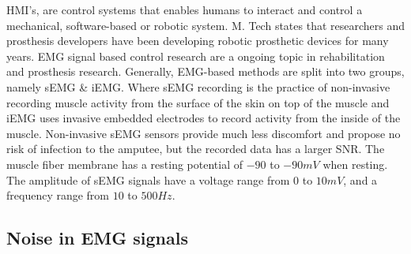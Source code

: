 \documentclass[../main.tex]{subfiles}
\begin{document}
\gls{HMI}'s, are control systems that enables humans to interact and control a mechanical, software-based or robotic system.
M. Tech \cite{Tech2015} states that researchers and prosthesis developers have been developing robotic prosthetic devices for many years.
\gls{EMG} signal based control research are a ongoing topic in rehabilitation and prosthesis research.
Generally, \gls{EMG}-based methods are split into two groups, namely \gls{sEMG} \& \gls{iEMG}.
Where \gls{sEMG} recording is the practice of non-invasive recording muscle activity from the surface of the skin on top of the muscle and \gls{iEMG} uses invasive embedded electrodes to record activity from the inside of the muscle.
Non-invasive \gls{sEMG} sensors provide much less discomfort and propose no risk of infection to the amputee, but the recorded data has a larger \gls{SNR}.
The muscle fiber membrane has a resting potential of $-90$ to $-90 mV$ when resting.
The amplitude of sEMG signals have a voltage range from $0$ to $10 mV$, and a frequency range from $10$ to $500 Hz$.

\subsection{Noise in EMG signals}
\label{sec:noise}
\end{document}

